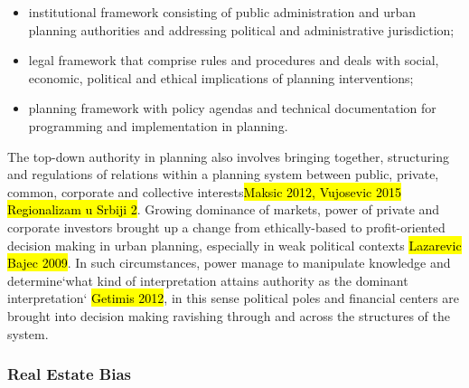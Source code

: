 \documentclass[11pt]{report}
\begin{document}
\begin{itemize}
\item institutional framework consisting of public administration and urban planning authorities and addressing political and administrative jurisdiction;
\item legal framework that comprise rules and procedures and deals with social, economic, political and ethical implications of planning interventions;
\item planning framework with policy agendas and technical documentation for programming and implementation in planning.
\end{itemize}

The top-down authority in planning also involves bringing together, structuring and regulations of relations within a planning system between public, private, common, corporate and collective interests\footnotemark \hl{Maksic 2012, Vujosevic 2015 Regionalizam u Srbiji 2}.
Growing dominance of markets, power of private and corporate investors brought up a change from ethically-based to profit-oriented decision making in urban planning, especially in weak political contexts \hl{Lazarevic Bajec 2009}.
In such circumstances, power manage to manipulate knowledge and determine`what kind of interpretation attains authority as the dominant interpretation` \hl{Getimis 2012}, in this sense political poles and financial centers are brought into decision making ravishing through and across the structures of the system.

\subsubsection{Real Estate Bias}
\end{document}
